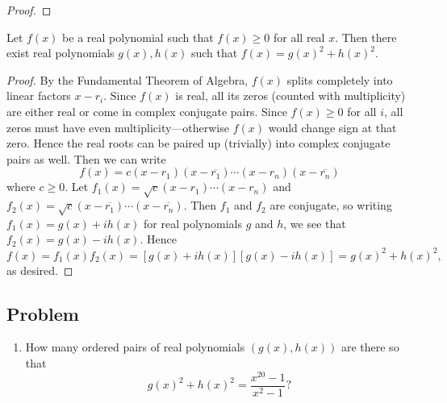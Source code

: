 \begin{proof}
\end{proof}

\begin{ex}
Let $f(x)$ be a real polynomial such that $f(x)\geq 0$ for all real $x$. Then  there exist real polynomials $g(x),h(x)$
such that $f(x) = g(x)^2+h(x)^2$.
\end{ex}
\begin{proof}
By the Fundamental Theorem of Algebra, $f(x)$ splits completely into linear factors $x-r_i$. 
Since $f(x)$ is real, all its zeros (counted with multiplicity) are either real or come in complex conjugate pairs. Since $f(x)\geq 0$ for all $i$, all zeros must have even multiplicity---otherwise $f(x)$ would change sign at that zero. Hence the real roots can be paired up (trivially) into complex conjugate pairs as well. Then we can write
\[
f(x)=c(x-r_1)(x-\overline{r_1})\cdots (x-r_n)(x-\overline{r_n})
\]
where $c\geq 0$.
Let $f_1(x)=\sqrt c(x-r_1)\cdots (x-r_n)$ and $f_2(x)=\sqrt c(x-\overline{r_1})\cdots (x-\overline{r_n})$. Then $f_1$ and $f_2$ are conjugate, so writing $f_1(x)=g(x)+ih(x)$ for real polynomials $g$ and $h$, we see that $f_2(x)=g(x)-ih(x)$. Hence
\[
f(x)=f_1(x)f_2(x)=[g(x)+ih(x)][g(x)-ih(x)]=g(x)^2+h(x)^2,
\]
as desired.
\end{proof}

\subsection{Problem}
\begin{enumerate}
\item 
How many ordered pairs of real polynomials $(g(x),h(x))$ are there so that
\[g(x)^2+h(x)^2=\frac{x^{20}-1}{x^2-1}?\]
\end{enumerate}


